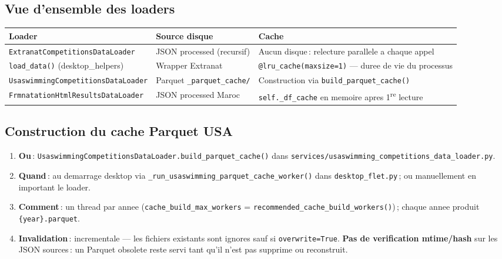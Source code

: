 \documentclass[11pt,a4paper]{article}
\begin{document}
\subsection{Vue d'ensemble des loaders}

\begin{longtable}{@{}p{}p{}p{}@{}}
\toprule
\textbf{Loader} & \textbf{Source disque} & \textbf{Cache} \\
\midrule
\endhead
\texttt{ExtranatCompetitionsDataLoader} & JSON processed (recursif) & Aucun disque\,: relecture parallele a chaque appel \\
\texttt{load\_data()} (desktop\_helpers) & Wrapper Extranat & \texttt{@lru\_cache(maxsize=1)} --- duree de vie du processus \\
\texttt{UsaswimmingCompetitionsDataLoader} & Parquet \texttt{\_parquet\_cache/} & Construction via \texttt{build\_parquet\_cache()} \\
\texttt{FrmnatationHtmlResultsDataLoader} & JSON processed Maroc & \texttt{self.\_df\_cache} en memoire apres 1\textsuperscript{re} lecture \\
\bottomrule
\end{longtable}

\subsection{Construction du cache Parquet USA}

\begin{enumerate}
  \item \textbf{Ou}\,: \texttt{UsaswimmingCompetitionsDataLoader.build\_parquet\_cache()} dans \texttt{services/usaswimming\_competitions\_data\_loader.py}.
  \item \textbf{Quand}\,: au demarrage desktop via \texttt{\_run\_usaswimming\_parquet\_cache\_worker()} dans \texttt{desktop\_flet.py}\,; ou manuellement en important le loader.
  \item \textbf{Comment}\,: un thread par annee (\texttt{cache\_build\_max\_workers} = \texttt{recommended\_cache\_build\_workers()})\,; chaque annee produit \texttt{\{year\}.parquet}.
  \item \textbf{Invalidation}\,: incrementale --- les fichiers existants sont ignores sauf si \texttt{overwrite=True}. \textbf{Pas de verification mtime/hash} sur les JSON sources\,: un Parquet obsolete reste servi tant qu'il n'est pas supprime ou reconstruit.
\end{enumerate}
\end{document}
